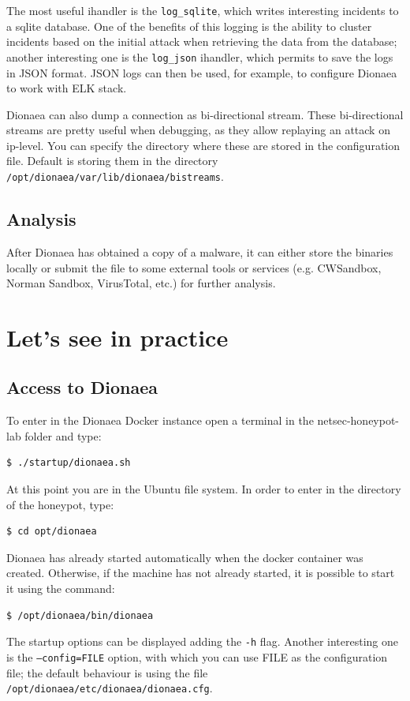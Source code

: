 \documentclass[epsfig,a4paper,11pt,titlepage,oneside,openany]{book}
\begin{document}
The most useful ihandler is the \texttt{log\_sqlite}, which writes interesting incidents to a sqlite database. One of the benefits of this logging is the ability to cluster incidents based on the initial attack when retrieving the data from the database; another interesting one is the \texttt{log\_json} ihandler, which permits to save the logs in JSON format. JSON logs can then be used, for example, to configure Dionaea to work with ELK stack.

Dionaea can also dump a connection as bi-directional stream. These bi-directional streams are pretty useful when debugging, as they allow replaying an attack on ip-level. You can specify the directory where these are stored in the configuration file. Default is storing them in the directory \texttt{/opt/dionaea/var/lib/dionaea/bistreams}.

\subsection{Analysis}

After Dionaea has obtained a copy of a malware, it can either store the binaries locally or submit the file to some external tools or services (e.g. CWSandbox, Norman Sandbox, VirusTotal, etc.) for further analysis.

\section{Let's see in practice}

\subsection{Access to Dionaea}


To enter in the Dionaea Docker instance open a terminal in the netsec-honeypot-lab folder and type:

\begin{lstlisting}[language=bash]
$ ./startup/dionaea.sh
\end{lstlisting}

\noindent At this point you are in the Ubuntu file system. In order to enter in the directory of the honeypot, type:
\begin{lstlisting}[language=bash]
$ cd opt/dionaea
\end{lstlisting}

\noindent Dionaea has already started automatically when the docker container was created. Otherwise, if the machine has not already started, it is possible to start it using the command:
\begin{lstlisting}[language=bash]
$ /opt/dionaea/bin/dionaea
\end{lstlisting}
The startup options can be displayed adding the \texttt{-h} flag. Another interesting one is the \texttt{--config=FILE} option, with which you can use FILE as the configuration file; the default behaviour is using the file \texttt{/opt/dionaea/etc/dionaea/dionaea.cfg}.
\end{document}
